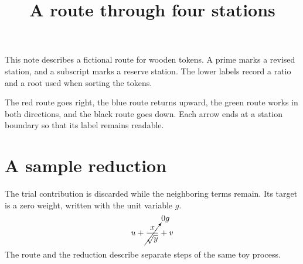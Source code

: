 \documentclass{article}
\title{A route through four stations}
\author{}
\date{}
\begin{document}
\maketitle

This note describes a fictional route for wooden tokens. A prime marks a
revised station, and a subscript marks a reserve station. The lower labels
record a ratio and a root used when sorting the tokens.

\begin{center}
\end{center}

The red route goes right, the blue route returns upward, the green route
works in both directions, and the black route goes down. Each arrow ends
at a station boundary so that its label remains readable.

\section{A sample reduction}
The trial contribution is discarded while the neighboring terms remain.
Its target is a zero weight, written with the unit variable \(g\).
\[
u+\cancelto{0g}{\frac{x}{\sqrt{y}}}+v
\]
The route and the reduction describe separate steps of the same toy process.
\end{document}
